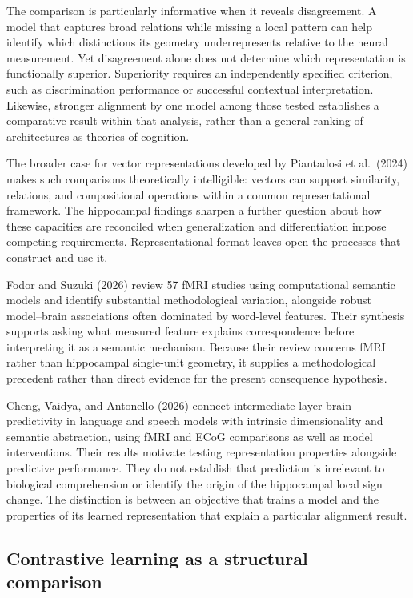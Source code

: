 \documentclass[11pt]{article}
\begin{document}
The comparison is particularly informative when it reveals disagreement.
A model that captures broad relations while missing a local pattern can
help identify which distinctions its geometry underrepresents relative
to the neural measurement. Yet disagreement alone does not determine
which representation is functionally superior. Superiority requires an
independently specified criterion, such as discrimination performance or
successful contextual interpretation. Likewise, stronger alignment by
one model among those tested establishes a comparative result within
that analysis, rather than a general ranking of architectures as
theories of cognition.

The broader case for vector representations developed by Piantadosi et
al.~(2024) makes such comparisons theoretically intelligible: vectors
can support similarity, relations, and compositional operations within a
common representational framework. The hippocampal findings sharpen a
further question about how these capacities are reconciled when
generalization and differentiation impose competing requirements.
Representational format leaves open the processes that construct and use
it.

Fodor and Suzuki (2026) review 57 fMRI studies using computational
semantic models and identify substantial methodological variation,
alongside robust model--brain associations often dominated by word-level
features. Their synthesis supports asking what measured feature explains
correspondence before interpreting it as a semantic mechanism. Because
their review concerns fMRI rather than hippocampal single-unit geometry,
it supplies a methodological precedent rather than direct evidence for
the present consequence hypothesis.

Cheng, Vaidya, and Antonello (2026) connect intermediate-layer brain
predictivity in language and speech models with intrinsic dimensionality
and semantic abstraction, using fMRI and ECoG comparisons as well as
model interventions. Their results motivate testing representation
properties alongside predictive performance. They do not establish that
prediction is irrelevant to biological comprehension or identify the
origin of the hippocampal local sign change. The distinction is between
an objective that trains a model and the properties of its learned
representation that explain a particular alignment result.

\hypertarget{contrastive-learning-as-a-structural-comparison}{%
\subsection{Contrastive learning as a structural
comparison}\label{contrastive-learning-as-a-structural-comparison}}
\end{document}
